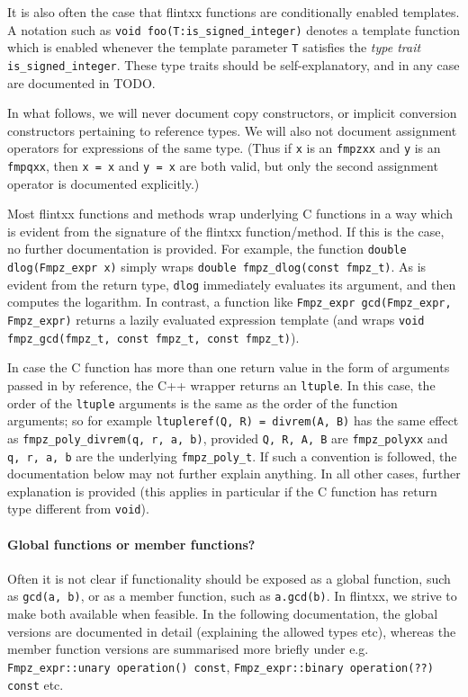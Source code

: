 \documentclass[a4paper,10pt]{book}
\newcommand{\code}{\lstinline}
\begin{document}
{{It is also often the case that flintxx functions are conditionally enabled
templates. A notation such as \code{void foo(T:is_signed_integer)} denotes a
template function which is enabled whenever the template parameter \code{T}
satisfies the \emph{type trait} \code{is_signed_integer}. These type traits
should be self-explanatory, and in any case are documented in TODO.

In what follows, we will never document copy constructors,
or implicit conversion constructors pertaining to reference types. We will also
not document assignment operators for expressions of the same type. (Thus if
\code{x} is an \code{fmpzxx} and \code{y} is an \code{fmpqxx}, then \code{x = x}
and \code{y = x} are both valid, but only the second assignment operator is
documented explicitly.)

Most flintxx functions and methods wrap underlying C functions in a way which is
evident from the signature of the flintxx function/method. If this is the case,
no further documentation is provided. For example, the function
\code{double dlog(Fmpz_expr x)} simply wraps
\code{double fmpz_dlog(const fmpz_t)}.  As is
evident from the return type, \code{dlog} immediately evaluates its argument,
and then computes the logarithm. In contrast, a function like
\code{Fmpz_expr gcd(Fmpz_expr, Fmpz_expr)} returns a lazily evaluated expression
template (and wraps \code{void fmpz_gcd(fmpz_t, const fmpz_t, const fmpz_t)}).

In case the C function has more than one return value in the form of arguments
passed in by reference, the C++ wrapper returns an \code{ltuple}. In this case,
the order of the \code{ltuple} arguments is the same as the order of the
function arguments; so for example \code{ltupleref(Q, R) = divrem(A, B)} has the
same effect as \code{fmpz_poly_divrem(q, r, a, b)}, provided \code{Q, R, A, B}
are \code{fmpz_polyxx} and \code{q, r, a, b} are the underlying
\code{fmpz_poly_t}. If such a convention is followed, the documentation below
may not further explain anything. In all other cases, further explanation is
provided (this applies in particular if the C function has return type different
from \code{void}).

\paragraph{Global functions or member functions?} Often it is not clear if
functionality should be exposed as a global function,
such as \code{gcd(a, b)}, or as a member
function, such as \code{a.gcd(b)}. In flintxx, we strive to make both available
when feasible. In the following documentation, the global versions are
documented in detail (explaining the allowed types etc), whereas the member
function versions are summarised more briefly under e.g.
\code{Fmpz_expr::unary operation() const},
\code{Fmpz_expr::binary operation(??) const} etc.

}}
\end{document}
